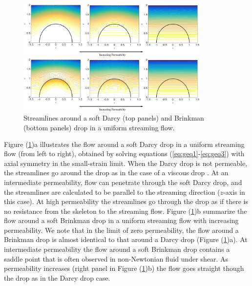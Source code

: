 \documentclass[11pt]{article}
\begin{document}
%
\begin{figure}
\centerline{\includegraphics[width=3.75in]{figs/DarcyDropUFlow0927aa.pdf}}
\smallskip\par
\centerline{\includegraphics[width=3.75in]{figs/BrinkmanDropUFlow0927aa.pdf}}
\vspace{-7pt}
\caption{\footnotesize Streamlines around a soft Darcy (top panels) and Brinkman (bottom panels) drop in a uniform streaming flow.}
\label{fig:DarcyDropUFlow0927}
\end{figure}
%
Figure (\ref{fig:DarcyDropUFlow0927})a illustrates the flow around a soft Darcy drop in a uniform streaming flow 
(from left to right),
obtained by solving equations (\ref{eq:geq1}-\ref{eq:geq3}) with axial symmetry in the small-strain limit. When the Darcy drop is 
not permeable, the streamlines go around the
drop as in the case of a viscous drop \cite{DavisStone1993_CES,GLeal_AdvancedTransportPhenomena}. At an intermediate permeability, flow can penetrate through the soft 
Darcy drop, and the streamlines are calculated
to be parallel to the streaming direction ($z$-axis in this case). At high permeability the streamlines go through the drop as if there 
is no resistance from the skeleton to the 
streaming flow.
Figure (\ref{fig:DarcyDropUFlow0927})b summarize the flow around a soft Brinkman drop in a uniform streaming 
flow with increasing permeability.
We note that in the limit of zero permeability, the flow around a Brinkman drop is almost identical to that around a Darcy drop 
(Figure (\ref{fig:DarcyDropUFlow0927})a).
At intermediate permeability the flow around a soft Brinkman drop contains a saddle point that is often observed in non-Newtonian 
fluid under shear. 
As permeability increases (right panel in Figure (\ref{fig:DarcyDropUFlow0927})b) the flow goes straight though the 
drop as in the Darcy drop case.
\end{document}
